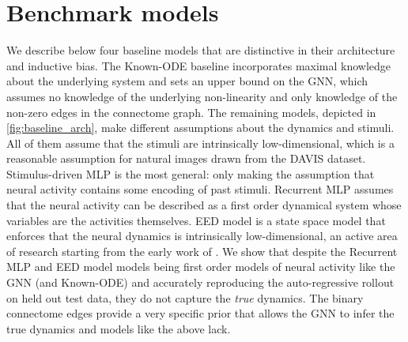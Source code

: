 \documentclass{article}
\def\stimbase{Stimulus-driven MLP}
\def\eedbase{EED model}
\def\mlpbase{Recurrent MLP}
\begin{document}
\newpage
\section{Benchmark models}
\label{app:benchmark}



We describe below four baseline models that are distinctive in their architecture and inductive bias.
The Known-ODE baseline incorporates maximal knowledge about the underlying system and sets an upper bound on the GNN, which assumes 
no knowledge of the underlying non-linearity and only knowledge of the non-zero edges in the connectome graph. 
The remaining models, depicted in \cref{fig:baseline_arch}, make different assumptions about the dynamics and stimuli. All of them assume that the stimuli are intrinsically low-dimensional, which is a reasonable assumption for natural images drawn from the DAVIS dataset. \stimbase{} is the most general: only making the assumption that neural activity contains some encoding of past stimuli. \mlpbase{} assumes that the neural activity can be described as a first order dynamical system whose variables are the activities themselves. \eedbase{} is a state space model that enforces that the neural dynamics is intrinsically low-dimensional, an active area of research starting from the early work of \citep{churchland_neural_2012, pandarinath_inferring_2018}. We show that despite the \mlpbase{} and \eedbase{} models being first order models of neural activity like the GNN (and Known-ODE) and accurately reproducing the auto-regressive rollout on held out test data, they do not capture the \emph{true} dynamics. The binary connectome edges provide a very specific prior that allows the GNN to infer the true dynamics and models like the above lack.
\end{document}
